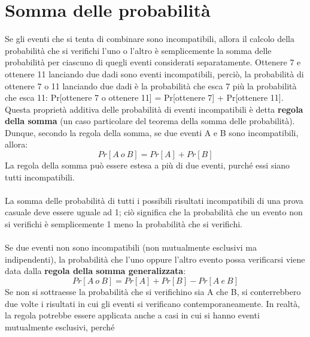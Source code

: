 \documentclass[drafts, 10pt]{book}
\begin{document}
\section{Somma delle probabilità}
Se gli eventi che si tenta di combinare sono incompatibili, allora il calcolo della probabilità che si verifichi l'uno o l'altro è semplicemente la somma delle probabilità per ciascuno di quegli eventi considerati separatamente. Ottenere 7 e ottenere 11 lanciando due dadi sono eventi incompatibili, perciò, la probabilità di ottenere 7 o 11 lanciando due dadi è la probabilità che esca 7 più la probabilità che esca 11: Pr[ottenere 7 o ottenere 11] = Pr[ottenere 7] + Pr[ottenere 11].
\\
Questa proprietà additiva delle probabilità di eventi incompatibili è detta \textbf{regola della somma} (un caso particolare del teorema della somma delle probabilità). 
\\
Dunque, secondo la regola della somma, se due eventi A e B sono incompatibili, allora: 
\begin{equation}
    Pr[A\ o\ B] = Pr[A] + Pr[B]
\end{equation}
La regola della somma può essere estesa a più di due eventi, purché essi siano tutti incompatibili.
\\
\\
La somma delle probabilità di tutti i possibili risultati incompatibili di una prova casuale deve essere uguale ad 1; ciò significa che la probabilità che un evento non si verifichi è semplicemente 1 meno la probabilità che si verifichi.
\\
\\
Se due eventi non sono incompatibili (non mutualmente esclusivi ma indipendenti), la probabilità che l'uno oppure l'altro evento possa verificarsi viene data dalla \textbf{regola della somma generalizzata}:
\begin{equation}
    Pr[A\ o\ B] = Pr[A] + Pr[B] - Pr[A\ e\ B]
\end{equation}
Se non si sottraesse la probabilità che si verifichino sia A che B, si conterrebbero due volte i risultati in cui gli eventi si verificano contemporaneamente.
In realtà, la regola potrebbe essere applicata anche a casi in cui si hanno eventi mutualmente esclusivi, \colorbox{lyellow}{perché}
\end{document}
